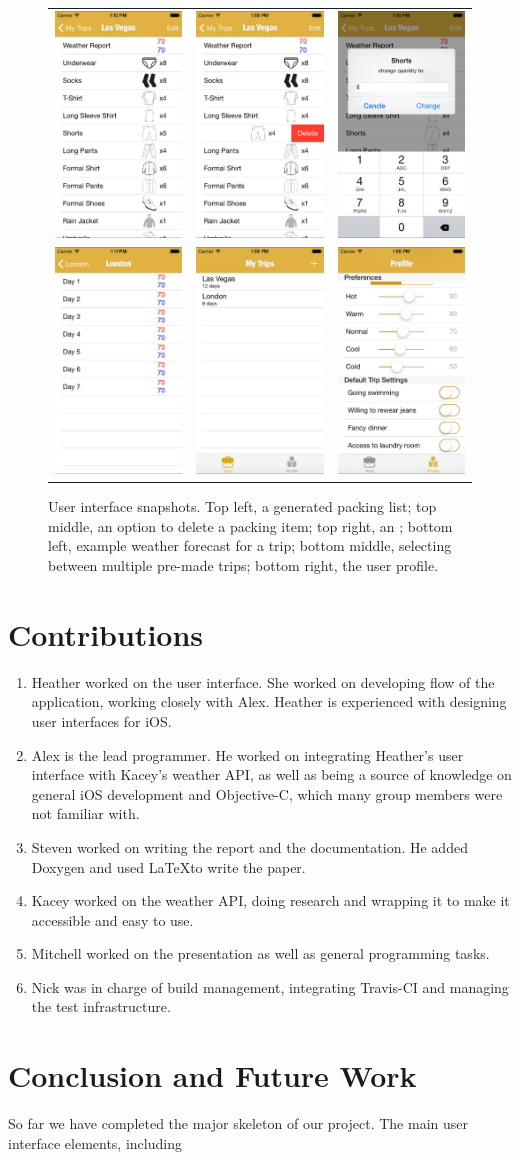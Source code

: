 \documentclass[11pt]{article}
\begin{document}
\begin{figure}
    \centering
    \begin{tabular}{ccc}
    \includegraphics[scale=0.2]{img/ui-2.jpg} & \includegraphics[scale=0.2]{img/ui-1.jpg} & \includegraphics[scale=0.2]{img/ui-7.jpg}\\
    \includegraphics[scale=0.2]{img/ui-5.jpg} & \includegraphics[scale=0.2]{img/ui-6.jpg} & \includegraphics[scale=0.2]{img/ui-4.jpg}
    \end{tabular}
    \caption{User interface snapshots. Top left, a generated packing list; top middle, an option to delete a packing item; top right, an ; bottom left, example weather forecast for a trip; bottom middle, selecting between multiple pre-made trips; bottom right, the user profile.}
    \label{fig:ui}
\end{figure}



\section{Contributions}
\begin{enumerate}
\item Heather worked on the user interface. She worked on developing flow of the application, working closely with Alex. Heather is experienced with designing user interfaces for iOS.
\item Alex is the lead programmer. He worked on integrating Heather's user interface with Kacey's weather API, as well as being a source of knowledge on general iOS development and Objective-C, which many group members were not familiar with.
\item Steven worked on writing the report and the documentation. He added Doxygen and used \LaTeX to write the paper. 
\item Kacey worked on the weather API, doing research and wrapping it to make it accessible and easy to use. 
\item Mitchell worked on the presentation as well as general programming tasks.
\item Nick was in charge of build management, integrating Travis-CI and managing the test infrastructure.
\end{enumerate}

\section{Conclusion and Future Work}
So far we have completed the major skeleton of our project. The main user interface elements, including 
\end{document}
